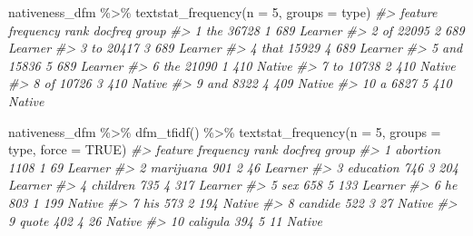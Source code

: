 \documentclass[
]{article}
\newenvironment{Shaded}{\begin{snugshade}}{\end{snugshade}}
\newcommand{\AttributeTok}[1]{\textcolor[rgb]{0.77,0.63,0.00}{#1}}
\newcommand{\CommentTok}[1]{\textcolor[rgb]{0.56,0.35,0.01}{\textit{#1}}}
\newcommand{\ConstantTok}[1]{\textcolor[rgb]{0.00,0.00,0.00}{#1}}
\newcommand{\DecValTok}[1]{\textcolor[rgb]{0.00,0.00,0.81}{#1}}
\newcommand{\FunctionTok}[1]{\textcolor[rgb]{0.00,0.00,0.00}{#1}}
\newcommand{\NormalTok}[1]{#1}
\newcommand{\SpecialCharTok}[1]{\textcolor[rgb]{0.00,0.00,0.00}{#1}}
\begin{document}
\begin{Shaded}
\begin{Highlighting}[]
\NormalTok{nativeness\_dfm }\SpecialCharTok{\%\textgreater{}\%}
    \FunctionTok{textstat\_frequency}\NormalTok{(}\AttributeTok{n =} \DecValTok{5}\NormalTok{, }\AttributeTok{groups =}\NormalTok{ type)}
\CommentTok{\#\textgreater{}    feature frequency rank docfreq   group}
\CommentTok{\#\textgreater{} 1      the     36728    1     689 Learner}
\CommentTok{\#\textgreater{} 2       of     22095    2     689 Learner}
\CommentTok{\#\textgreater{} 3       to     20417    3     689 Learner}
\CommentTok{\#\textgreater{} 4     that     15929    4     689 Learner}
\CommentTok{\#\textgreater{} 5      and     15836    5     689 Learner}
\CommentTok{\#\textgreater{} 6      the     21090    1     410  Native}
\CommentTok{\#\textgreater{} 7       to     10738    2     410  Native}
\CommentTok{\#\textgreater{} 8       of     10726    3     410  Native}
\CommentTok{\#\textgreater{} 9      and      8322    4     409  Native}
\CommentTok{\#\textgreater{} 10       a      6827    5     410  Native}
\end{Highlighting}
\end{Shaded}

\begin{Shaded}
\begin{Highlighting}[]
\NormalTok{nativeness\_dfm }\SpecialCharTok{\%\textgreater{}\%}
    \FunctionTok{dfm\_tfidf}\NormalTok{() }\SpecialCharTok{\%\textgreater{}\%}
    \FunctionTok{textstat\_frequency}\NormalTok{(}\AttributeTok{n =} \DecValTok{5}\NormalTok{, }\AttributeTok{groups =}\NormalTok{ type, }\AttributeTok{force =} \ConstantTok{TRUE}\NormalTok{)}
\CommentTok{\#\textgreater{}      feature frequency rank docfreq   group}
\CommentTok{\#\textgreater{} 1   abortion      1108    1      69 Learner}
\CommentTok{\#\textgreater{} 2  marijuana       901    2      46 Learner}
\CommentTok{\#\textgreater{} 3  education       746    3     204 Learner}
\CommentTok{\#\textgreater{} 4   children       735    4     317 Learner}
\CommentTok{\#\textgreater{} 5        sex       658    5     133 Learner}
\CommentTok{\#\textgreater{} 6         he       803    1     199  Native}
\CommentTok{\#\textgreater{} 7        his       573    2     194  Native}
\CommentTok{\#\textgreater{} 8    candide       522    3      27  Native}
\CommentTok{\#\textgreater{} 9      quote       402    4      26  Native}
\CommentTok{\#\textgreater{} 10  caligula       394    5      11  Native}
\end{Highlighting}
\end{Shaded}
\end{document}
